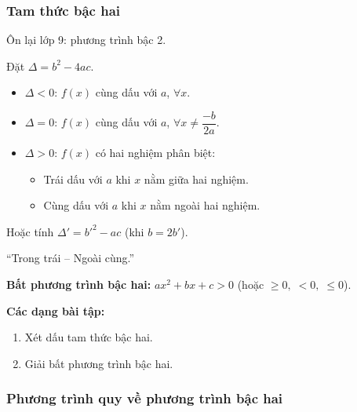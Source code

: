 \documentclass[12pt,a4paper]{article}
\begin{document}
\subsubsection{Tam thức bậc hai}

\begin{luuy}
  Ôn lại lớp 9: phương trình bậc 2.
\end{luuy}

\begin{tinhchat}[title={Dấu của tam thức bậc hai $f(x) = ax^2 + bx + c$}]
  Đặt $\Delta = b^2 - 4ac$.
  \begin{itemize}
    \item $\Delta < 0$: $f(x)$ cùng dấu với $a$, $\forall x$.
    \item $\Delta = 0$: $f(x)$ cùng dấu với $a$, $\forall x \ne \dfrac{-b}{2a}$.
    \item $\Delta > 0$: $f(x)$ có hai nghiệm phân biệt:
      \begin{itemize}
        \item Trái dấu với $a$ khi $x$ nằm giữa hai nghiệm.
        \item Cùng dấu với $a$ khi $x$ nằm ngoài hai nghiệm.
      \end{itemize}
  \end{itemize}

  Hoặc tính $\Delta' = b'^2 - ac$ (khi $b = 2b'$).
\end{tinhchat}

\begin{luuy}
  ``Trong trái -- Ngoài cùng.''
\end{luuy}

\begin{dinhnghia}
  \textbf{Bất phương trình bậc hai:} $ax^2 + bx + c > 0$ (hoặc $\ge 0,\; < 0,\; \le 0$).
\end{dinhnghia}

\medskip\noindent\textbf{Các dạng bài tập:}
\begin{enumerate}[label=\textbf{Dạng \arabic*:}, leftmargin=*, align=left]
  \item Xét dấu tam thức bậc hai.
  \item Giải bất phương trình bậc hai.
\end{enumerate}

\subsubsection{Phương trình quy về phương trình bậc hai}
\end{document}
